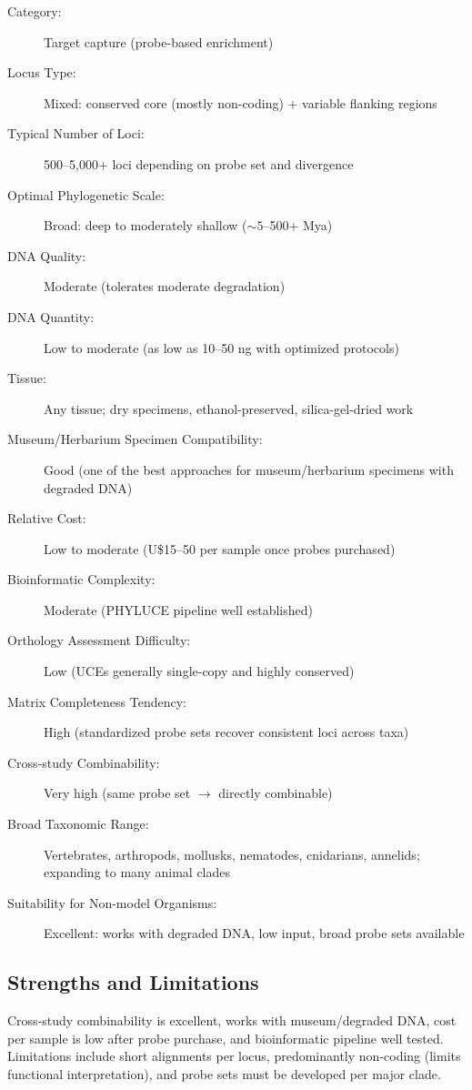 \begin{description}
\item[Category:] Target capture (probe-based enrichment)
\item[Locus Type:] Mixed: conserved core (mostly non-coding) + variable flanking regions
\item[Typical Number of Loci:] 500--5,000+ loci depending on probe set and divergence
\item[Optimal Phylogenetic Scale:] Broad: deep to moderately shallow (\(\sim 5\)--500+ Mya)
\item[DNA Quality:] Moderate (tolerates moderate degradation)
\item[DNA Quantity:] Low to moderate (as low as 10--50 ng with optimized protocols)
\item[Tissue:] Any tissue; dry specimens, ethanol-preserved, silica-gel-dried work
\item[Museum/Herbarium Specimen Compatibility:] Good (one of the best approaches for museum/herbarium specimens with degraded DNA)
\item[Relative Cost:] Low to moderate (U\$15--50 per sample once probes purchased)
\item[Bioinformatic Complexity:] Moderate (PHYLUCE pipeline well established)
\item[Orthology Assessment Difficulty:] Low (UCEs generally single-copy and highly conserved)
\item[Matrix Completeness Tendency:] High (standardized probe sets recover consistent loci across taxa)
\item[Cross-study Combinability:] Very high (same probe set $\rightarrow$ directly combinable)
\item[Broad Taxonomic Range:] Vertebrates, arthropods, mollusks, nematodes, cnidarians, annelids; expanding to many animal clades
\item[Suitability for Non-model Organisms:] Excellent: works with degraded DNA, low input, broad probe sets available
\end{description}

\subsection{Strengths and Limitations}

Cross-study combinability is excellent, works with museum/degraded DNA, cost per sample is low after probe purchase, and bioinformatic pipeline well tested. Limitations include short alignments per locus, predominantly non-coding (limits functional interpretation), and probe sets must be developed per major clade.

